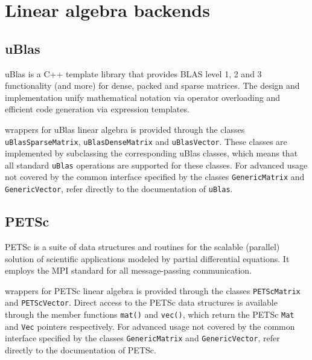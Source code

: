 \section{Linear algebra backends}

\subsection{uBlas}

uBlas is a C++ template library that provides BLAS level 1, 2 and 3
functionality (and more) for dense, packed and sparse matrices.
The design and implementation unify mathematical notation via operator
overloading and efficient code generation via expression templates.

\dolfin{} wrappers for uBlas linear algebra is provided through the
classes \texttt{uBlasSparseMatrix}, \texttt{uBlasDenseMatrix} and
\texttt{uBlasVector}. These classes are implemented by subclassing the
corresponding uBlas classes, which means that all standard
\texttt{uBlas} operations are supported for these classes. For
advanced usage not covered by the common \dolfin{} interface specified
by the classes \texttt{GenericMatrix} and \texttt{GenericVector},
refer directly to the documentation of \texttt{uBlas}.
\subsection{PETSc}

PETSc is a suite of data structures and routines for the scalable
(parallel) solution of scientific applications modeled by partial
differential equations. It employs the MPI standard for all 
message-passing communication.

\dolfin{} wrappers for PETSc linear algebra is provided through the
classes \texttt{PETScMatrix} and \texttt{PETScVector}. Direct access
to the PETSc data structures is available through the member functions
\texttt{mat()} and \texttt{vec()}, which return the PETSc \texttt{Mat}
and \texttt{Vec} pointers respectively. For advanced usage not covered
by the common \dolfin{} interface specified by the classes
\texttt{GenericMatrix} and \texttt{GenericVector}, refer directly to
the documentation of PETSc.
